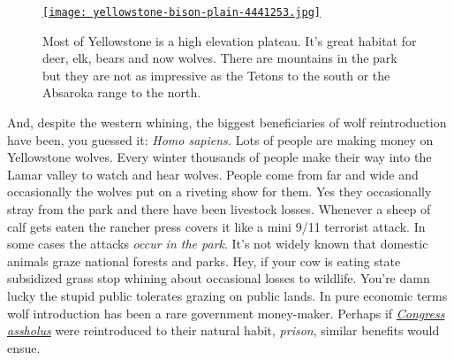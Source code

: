 \begin{SCfigure}
\centering
\href{http://conceptcontrol.smugmug.com/Trips/USA-and-Canada/North-Western/i-j7WcGTK/A}{\texttt{[image: yellowstone-bison-plain-4441253.jpg]}}
\caption[Most of Yellowstone is a high elevation plateau.]{Most of Yellowstone is a high elevation plateau. It's great habitat for
deer, elk, bears and now wolves. There are mountains in the park but
they are not as impressive as the Tetons to the south or the Absaroka
range to the north.}
\label{fig:4186X3}
\end{SCfigure}


And, despite the western whining, the biggest beneficiaries of wolf
reintroduction have been, you guessed it: \emph{Homo sapiens.} Lots of
people are making money on Yellowstone wolves. Every winter thousands of
people make their way into the Lamar valley to watch and hear wolves.
People come from far and wide and occasionally the wolves put on a
riveting show for them. Yes they occasionally stray from the park and
there have been livestock losses. Whenever a sheep of calf gets eaten
the rancher press covers it like a mini 9/11 terrorist attack. In some
cases the attacks \emph{occur in the park}. It's not widely known that
domestic animals graze national forests and parks. Hey, if your cow is
eating state subsidized grass stop whining about occasional losses to
wildlife. You're damn lucky the stupid public tolerates grazing on
public lands. In pure economic terms wolf introduction has been a rare
government money-maker. Perhaps if
\href{http://www.urbandictionary.com/define.php?term=congress}{\emph{Congress
assholus}} were reintroduced to their natural habit, \emph{prison},
similar benefits would ensue.

